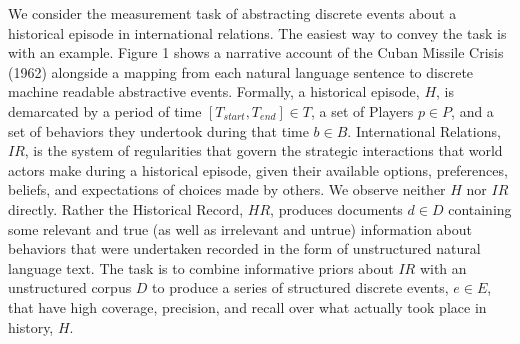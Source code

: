 \documentclass{article}
\begin{document}
We consider the measurement task of abstracting discrete events about a
historical episode in international relations. The easiest way to convey
the task is with an example. Figure 1 shows a narrative account of the
Cuban Missile Crisis (1962) alongside a mapping from each natural
language sentence to discrete machine readable abstractive events.
Formally, a historical episode, \(H\), is demarcated by a period of time
\([T_{start}, T_{end}] \in T\), a set of Players \(p \in P\), and a set
of behaviors they undertook during that time \(b \in B\). International
Relations, \(IR\), is the system of regularities that govern the
strategic interactions that world actors make during a historical
episode, given their available options, preferences, beliefs, and
expectations of choices made by others. We observe neither \(H\) nor
\(IR\) directly. Rather the Historical Record, \(HR\), produces
documents \(d \in D\) containing some relevant and true (as well as
irrelevant and untrue) information about behaviors that were undertaken
recorded in the form of unstructured natural language text. The task is
to combine informative priors about \(IR\) with an unstructured corpus
\(D\) to produce a series of structured discrete events, \(e \in E\),
that have high coverage, precision, and recall over what actually took
place in history, \(H\).
\end{document}
